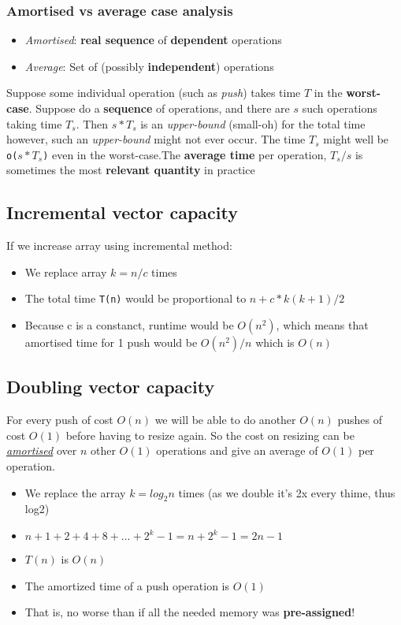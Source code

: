\documentclass{article}
\newcommand{\worddef}[1]{\hyperref[sec:reference]{\textit{#1}}}
\begin{document}
\subsubsection{Amortised vs average case analysis}
\begin{flushleft}
\begin{itemize}
	\item \textit{Amortised}: \textbf{real sequence} of \textbf{dependent} operations
	\item \textit{Average}: Set of (possibly \textbf{independent}) operations
\end{itemize}
Suppose some individual operation (such as \textit{push}) takes time $T$ in the \textbf{worst-case}. Suppose do a \textbf{sequence} of operations, and there are $s$ such operations taking time $T_{s}$. Then $s * T_{s}$ is an \textit{upper-bound} (small-oh) for the total time however, such an \textit{upper-bound} might not ever occur.
The time $T_{s}$ might well be \texttt{o($s * T_{s}$)} even in the worst-case.The \textbf{average time} per operation,
$T_{s}/s$ is sometimes the most \textbf{relevant quantity} in practice
\end{flushleft}

\subsection{Incremental vector capacity}
\begin{flushleft}
If we increase array using incremental method:
\begin{itemize}
	\item We replace array $k = n / c$ times
	\item The total time \texttt{T(n)} would be proportional to $n + c* k(k + 1)/2$
	\item Because c is a constanct, runtime would be $O(n^2)$, which means that amortised time for 1 push would be $O(n^2)/n$ which is $O(n)$ 
\end{itemize}
\end{flushleft}

\subsection{Doubling vector capacity}
\begin{flushleft}
For every push of cost $O(n)$ we will be able to do another $O(n)$ pushes of cost $O(1)$ before having to resize again. So the cost on resizing can be \worddef{amortised} over $n$ other $O(1)$ operations and give an average of $O(1)$ per operation.
\begin{itemize}
	\item We replace the array $k = log_2 n$ times (as we double it's 2x every thime, thus log2)
	\item $n + 1 + 2 + 4 + 8 + \textrm{...} + 2^k - 1 = n + 2^k -1 = 2n -1$
	\item $T(n)$ is $O(n)$
	\item The amortized time of a push operation is $O(1)$
	\item That is, no worse than if all the needed memory was \textbf{pre-assigned}!
\end{itemize}
\end{flushleft}
\end{document}
